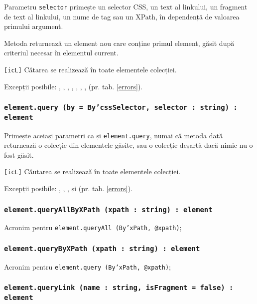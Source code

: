 Parametru \texttt{selector} primește un selector CSS, un text al linkului, un fragment de text al linkului, un nume de tag sau un XPath, în dependență de valoarea primului argument.

Metoda returnează un element nou care conține primul element, găsit după criteriul necesar în elementul current.

\texttt{[icL]} Cătarea se realizează în toate elementele colecției.

Excepții posibile: , , , , , , ,  (pr. tab. \ref{errors}).

\subsubsection{\texttt{element.query (by = By'cssSelector, selector : string) : element}}

Primește aceiași parametri ca și \texttt{element.query}, numai că metoda dată returnează o colecție din elementele găsite, sau o colecție deșartă dacă nimic nu o fost găsit.

\texttt{[icL]} Căutarea se realizează în toate elementele colecției.

Excepții posibile: , , ,  și  (pr. tab. \ref{errors}).

\subsubsection{\texttt{element.queryAllByXPath (xpath : string) : element}}

Acronim pentru \texttt{element.queryAll (By'xPath, @xpath)};

\subsubsection{\texttt{element.queryByXPath (xpath : string) : element}}

Acronim pentru \texttt{element.query (By'xPath, @xpath)};

\subsubsection{\texttt{element.queryLink (name : string, isFragment = false) : element}}

